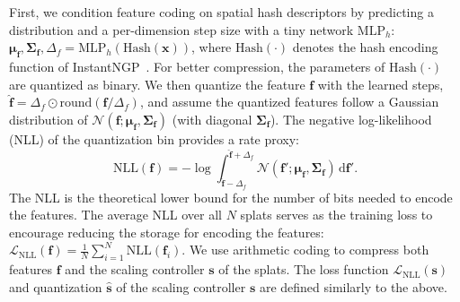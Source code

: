 \documentclass{article}
\def\vf{{\bm{f}}}
\def\vs{{\bm{s}}}
\def\vx{{\bm{x}}}
\newcommand{\MLP}{\mathrm{MLP}}
\begin{document}
First, we condition feature coding on spatial hash descriptors by predicting a distribution and a per-dimension step size with a tiny network $\MLP_h$:
%
  $\bm{\mu}_\vf, \bm{\Sigma}_\vf, \Delta_f = \MLP_{h}(\mathrm{Hash}(\vx))$,
%
where $\mathrm{Hash}(\cdot)$ denotes the hash encoding function of InstantNGP~\cite{muller2022instantngp}. For better compression, the parameters of $\mathrm{Hash}(\cdot)$ are quantized as binary. We then quantize the feature $\vf$ with the learned steps,
%
  $\hat{\vf} = \Delta_f \odot \mathrm{round}(\vf / \Delta_f)$,
%
and assume the quantized features follow a Gaussian distribution of $\mathcal{N}(\vf; \bm{\mu}_\vf, \bm{\Sigma}_\vf)$ (with diagonal $\bm{\Sigma}_\vf$). The negative log-likelihood (NLL) of the quantization bin provides a rate proxy:
\begin{equation}\textstyle
  \mathrm{NLL}(\vf) = -\log \int_{\hat{\vf}-\Delta_f}^{\hat{\vf}+\Delta_f} \mathcal{N}(\vf'; \bm{\mu}_\vf, \bm{\Sigma}_\vf) \,\mathrm{d}\vf'.
\end{equation}
The NLL is the theoretical lower bound for the number of bits needed to encode the features. The average NLL over all $N$ splats serves as the training loss to encourage reducing the storage for encoding the features:
%
  $\mathcal{L}_\text{NLL}(\vf) = \frac{1}{N} \sum_{i=1}^{N} \mathrm{NLL}(\vf_i)$.
%
%
We use arithmetic coding \cite{witten1987arithmetic} to compress both features $\vf$ and the scaling controller $\vs$ of the splats. The loss function $\mathcal{L}_\text{NLL}(\vs)$ and quantization $\hat{\vs}$ of the scaling controller $\vs$ are defined similarly to the above.




%
\end{document}

